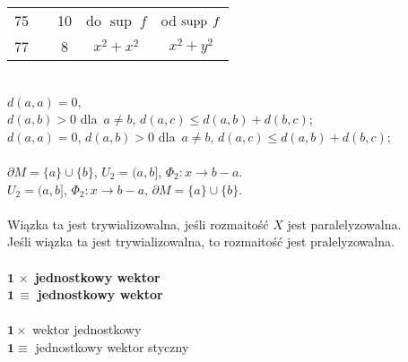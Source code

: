 \documentclass[a4paper,11pt]{article}
\begin{document}
\begin{center}
\begin{tabular}{|c|c|c|c|c|}
    75 & & 10 & do $\sup \; f$ & od $\mathrm{supp}\, \; f$ \\
    77 & & 8 & $x^{ 2 } + x^{ 2 }$ & $x^{ 2 } + y^{ 2 }$ \\
    \hline
  \end{tabular}

\end{center}


\noindent
{} \\
\Jest  $d( a, a ) = 0$, \\[0.1em]
$d( a,b ) > 0$ dla~$a \neq b$, $d( a, c ) \leq d( a, b ) + d( b,c )$; \\[0.3em]
\Powin $d( a, a ) = 0$, $d( a,b ) > 0$ dla~$a \neq b$,
$d( a, c ) \leq d( a, b ) + d( b,c )$; \\[0.3em]
 \\[0.3em]
\Jest  $\partial M = \{ a \} \cup \{ b \}$, $U_{ 2 } = ( a, b ]$,
$\Phi_{ 2 } : x \rightarrow b - a$. \\[0.3em]
\Powin $U_{ 2 } = ( a, b ]$, $\Phi_{ 2 } : x \rightarrow b - a$,
$\partial M = \{ a \} \cup \{ b \}$. \\[0.3em]
 \\
\Jest  Wiązka ta jest trywializowalna, jeśli rozmaitość $X$ jest
paralelyzowalna. \\
\Powin Jeśli wiązka ta jest trywializowalna, to rozmaitość jest
pralelyzowalna. \\
 \\
\Jest  $\mathbf{ 1 } \, \times$ \textbf{jednostkowy wektor} \\
\Powin $\mathbf{ 1 } \, \equiv$ \textbf{jednostkowy wektor} \\
 \\
\Jest  $\mathbf{ 1 } \times$ wektor jednostkowy \\
\Powin $\mathbf{ 1 } \equiv$ jednostkowy wektor styczny \\
\end{document}
